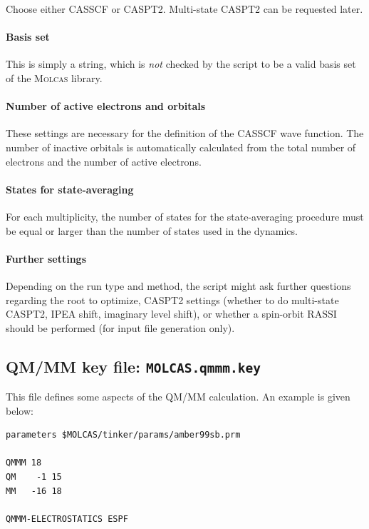 \documentclass[a4paper,10pt,DIV=15,openany]{scrbook}
\newcommand{\ttt}[1]{\textbf{\texttt{#1}}}
\newenvironment{example}{
  \setlength{\OuterFrameSep}{3pt}
  \vspace{0mm}
  \definecolor{shadecolor}{HTML}{E4F4FF}
  \begin{shaded}
}{
  \end{shaded}
}
\begin{document}
Choose either CASSCF or CASPT2. Multi-state CASPT2 can be requested later.

\paragraph{Basis set}

This is simply a string, which is \textit{not} checked by the script to be a valid basis set of the \textsc{Molcas} library.

\paragraph{Number of active electrons and orbitals}

These settings are necessary for the definition of the CASSCF wave function. The number of inactive orbitals is automatically calculated from the total number of electrons and the number of active electrons.

\paragraph{States for state-averaging}

For each multiplicity, the number of states for the state-averaging procedure must be equal or larger than the number of states used in the dynamics.

\paragraph{Further settings}

Depending on the run type and method, the script might ask further questions regarding the root to optimize, CASPT2 settings (whether to do multi-state CASPT2, IPEA shift, imaginary level shift), or whether a spin-orbit RASSI should be performed (for input file generation only).



\subsection{QM/MM key file: \ttt{MOLCAS.qmmm.key}}

This file defines some aspects of the QM/MM calculation. An example is given below:

\begin{example}
\begin{verbatim}
parameters $MOLCAS/tinker/params/amber99sb.prm

QMMM 18
QM    -1 15
MM   -16 18

QMMM-ELECTROSTATICS ESPF
\end{verbatim}
\end{example}
\end{document}
